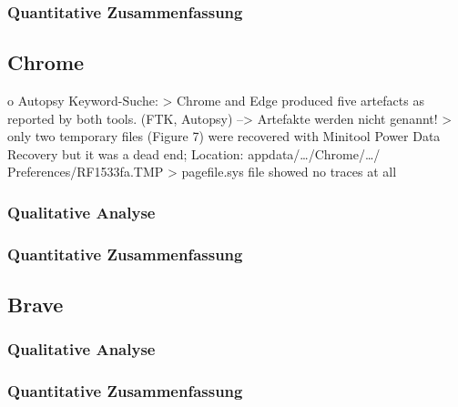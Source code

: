 		


\subsubsection*{Quantitative Zusammenfassung}


\subsection{Chrome}

o Autopsy Keyword-Suche: 
	> Chrome and Edge produced five artefacts as reported by both tools. (FTK, Autopsy) \cite{Gabet.2018}
		--> Artefakte werden nicht genannt!
	> only two temporary files (Figure 7) were recovered with Minitool Power Data Recovery but it was a dead end; Location: appdata/…/Chrome/…/ Preferences/RF1533fa.TMP \cite{Fayyad.2021}
	> pagefile.sys file showed no traces at all \cite{Said.2011}
	
\subsubsection*{Qualitative Analyse}

\subsubsection*{Quantitative Zusammenfassung}


\subsection{Brave}

\subsubsection*{Qualitative Analyse}

\subsubsection*{Quantitative Zusammenfassung}